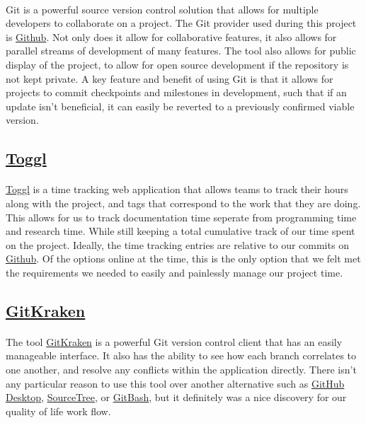 \documentclass[12pt]{article}
\begin{document}
\paragraph{}	Git is a powerful source version control solution that allows for multiple developers to collaborate on  a project. The Git provider used during this project is \href{https://Github.com}{Github}. Not only does it allow for collaborative features, it also allows for parallel streams of development of many features. The tool also allows for public display of the project, to allow for open source development if the repository is not kept private. A key feature and benefit of using Git is that it allows for projects to commit checkpoints and milestones in development, such that if an update isn't beneficial, it can easily be reverted to a previously confirmed viable version.

\subsection{\href{https://toggl.com}{Toggl}}
\paragraph{}	\href{https://toggl.com}{Toggl} is a time tracking web application that allows teams to track their hours along with the project, and tags that correspond to the work that they are doing. This allows for us to track documentation time seperate from programming time and research time. While still keeping a total cumulative track of our time spent on the project. Ideally, the time tracking entries are relative to our commits on \href{https://Github.com}{Github}. Of the options online at the time, this is the only option that we felt met the requirements we needed to easily and painlessly manage our project time.

\subsection{\href{https://www.gitkraken.com/}{GitKraken}}
\paragraph{}	The tool \href{https://www.gitkraken.com/}{GitKraken} is a powerful Git version control client that has an easily manageable interface. It also has the ability to see how each branch correlates to one another, and resolve any conflicts within the application directly. There isn't any particular reason to use this tool over another alternative such as \href{https://desktop.github.com/}{GitHub Desktop}, \href{https://www.sourcetreeapp.com/}{SourceTree}, or \href{https://gitforwindows.org/}{GitBash}, but it definitely was a nice discovery for our quality of life work flow. 
\end{document}
